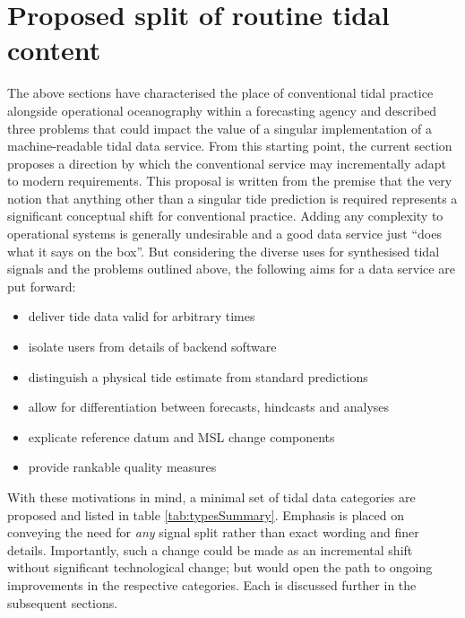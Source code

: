 \section{Proposed split of routine tidal content}
\label{Sec:proposed}
The above sections have characterised the place of conventional tidal practice alongside operational oceanography within a forecasting agency and described three problems that could impact the value of a singular implementation of a machine-readable tidal data service.   From this starting point, the current section proposes a direction by which the conventional service may incrementally adapt to modern requirements.  This proposal is written from the premise that the very notion that anything other than a singular tide prediction is required represents a significant conceptual shift for conventional practice.
Adding any complexity to operational systems is generally undesirable and a good data service just ``does what it says on the box''.  But considering the diverse uses for synthesised tidal signals and the problems outlined above, the following aims for a data service are put forward: 
\begin{itemize}
    \item deliver tide data valid for arbitrary times
    \item isolate users from details of backend software 
    \item distinguish a physical tide estimate from standard predictions
    \item allow for differentiation between forecasts, hindcasts and analyses
    \item explicate reference datum and MSL change components
    \item provide rankable quality measures
\end{itemize}

With these motivations in mind, a minimal set of tidal data categories are proposed and listed in table \ref{tab:typesSummary}.   Emphasis is placed on conveying the need for \textit{any} signal split rather than exact wording and finer details.  Importantly, such a change could be made as an incremental shift without significant technological change; but would open the path to ongoing improvements in the respective categories. 
Each is discussed further in the subsequent sections.

